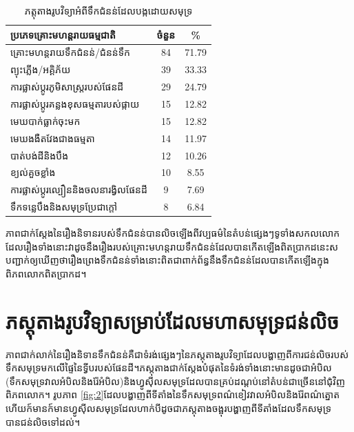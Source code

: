 \documentclass[10pt,twocolumn,letterpaper]{article}
\begin{document}
\begin{table}[ht]
\begin{center}
\renewcommand{\arraystretch}{1.2}  %
\begin{tabular}{|l|c|c|}
\hline
\textbf{ប្រភេទគ្រោះមហន្តរាយធម្មជាតិ} & \textbf{ចំនួន} & \textbf{\%}  \\
\hline\hline
គ្រោះមហន្តរាយទឹកជំនន់/ជំនន់ទឹក            & 84  & 71.79 \\
ព្យុះភ្លើង/អគ្គិភ័យ   & 39 & 33.33 \\
ការផ្លាស់ប្ដូរភូមិសាស្ត្ររបស់ផែនដី   & 29 & 24.79 \\
ការផ្លាស់ប្តូរគន្លងខុសធម្មតារបស់ផ្កាយ     & 15 & 12.82 \\
មេឃបាក់ធ្លាក់ចុះមក           & 15 & 12.82 \\
មេឃងងឺតវែងជាងធម្មតា      & 14 & 11.97 \\
បាត់បង់ដី​និង​បឹង    & 12 & 10.26 \\
ខ្យល់គួចខ្លាំង          & 10 & 8.55  \\
ការផ្លាស់ប្តូរល្បឿននិងចលនារង្វិលផែនដី & 9 & 7.69  \\
ទឹកទន្លេ​បឹង​និង​សមុទ្រប្រែជាក្តៅ & 8 & 6.84 \\
\hline
\end{tabular}
\end{center}
\caption{ភត្តុតាងរូបវិទ្យាអំពីទឹកជំនន់ដែលបង្កដោយសមុទ្រ}
\label{tab: 1}
\end{table}

ភាពជាក់ស្តែងនៃរឿងនិទានរបស់ទឹកជំនន់បានលិចឡើងពីវប្បធម៌នៃតំបន់ផ្សេងៗទូទាំងសកលលោក​ដែលរឿងទាំងនោះវាដូចនឹងរឿងរបស់គ្រោះមហន្តរាយទឹកជំនន់ដែលបានកើតឡើងពិតប្រាកដ​នេះសបញ្ជាក់ឲ្យឃើញថារឿងព្រេងទឹកជំនន់ទាំងនោះពិតជាពាក់ព័ន្ធនឹងទឹកជំនន់ដែលបានកើតឡើងក្នុងពិភពលោកពិតប្រាកដ។

\section{ភស្តុតាងរូបវិទ្យាសម្រាប់ដែលមហាសមុទ្រជន់លិច}

ភាពជាក់លាក់នៃរឿងនិទានទឹកជំនន់គឺជាទំរង់ផ្សេងៗនៃភស្តុតាងរូបវិទ្យាដែលបង្ហាញពីការជន់លិចរបស់ទឹកសមុទ្រមកលើផ្ទៃនៃទ្វីបរបស់ផែនដី។ភស្តុតាងជាក់ស្តែងបំផុតនៃទំរង់ទាំងនោះមានដូចជាអំបិល​(ទឹកសមុទ្រ​វាលអំបិល​និងរ៉ែអំបិល)​និង​ហ្វូស៊ីលសមុទ្រដែលបានគ្រប់ដណ្តប់នៅតំបន់ជាច្រើននៅជុំវិញពិភពលោក។ រូបភាព \ref{fig:2} ​ដែលបង្ហាញពីទីតាំងនៃទឹកសមុទ្រពណ៌ខៀវ​វាលអំបិលនិងរ៉ែពណ៌ត្នោត​ហើយក៍មានក៍មានហ្វូស៊ីលសមុទ្រ​\cite{15,16,86,87} ដែលហាក់បីដូចជាភស្តុតាងចង្អុរបង្ហាញពីទីតាំងដែលទឹកសមុទ្របានជន់លិចទៅដល់។
\end{document}
